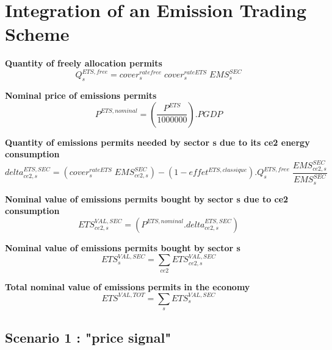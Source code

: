 \documentclass[12pt]{article}
\numberwithin{equation}{section}
\begin{document}
\section{Integration of an Emission Trading Scheme}



\noindent\textbf{Quantity of freely allocation permits} \\
\begin{dmath}
Q^{ETS,free}_{s} = cover^{ratefree}_{s} \; cover^{rateETS}_{s} \; EMS^{SEC}_{s}
\end{dmath}


\noindent\textbf{Nominal price of emissions permits} \\
\begin{dmath}
P^{ETS,nominal} = \left( \frac{P^{ETS}}{1000000} \right) . PGDP
\end{dmath}


\noindent\textbf{Quantity of emissions permits needed by sector s due to its ce2 energy consumption} \\
\begin{dmath}
delta^{ETS,SEC}_{ce2, s} = \left( cover^{rateETS}_{s} \; EMS^{SEC}_{ce2, s} \right) - \left( 1 - effet^{ETS,classique} \right) . Q^{ETS,free}_{s} \; \frac{EMS^{SEC}_{ce2, s}}{EMS^{SEC}_{s}}
\end{dmath}

\noindent\textbf{Nominal value of emissions permits bought by sector s due to ce2 consumption} \\
\begin{dmath}
ETS^{VAL,SEC}_{ce2, s} = \left( P^{ETS,nominal} . delta^{ETS,SEC}_{ce2, s} \right)
\end{dmath}


\noindent\textbf{Nominal value of emissions permits bought by sector s} \\
\begin{dmath}
ETS^{VAL,SEC}_{s} = \sum_{ce2} ETS^{VAL,SEC}_{ce2, s}
\end{dmath}


\noindent\textbf{Total nominal value of emissions permits in the economy} \\
\begin{dmath}
ETS^{VAL,TOT} = \sum_{s} ETS^{VAL,SEC}_{s}
\end{dmath}



\subsection{Scenario 1 : "price signal"}
\end{document}
